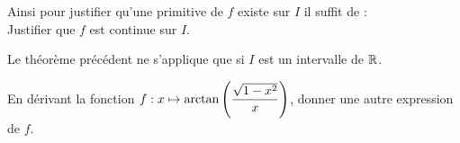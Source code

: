 \documentclass[a4paper, 11pt]{article}
\begin{document}
\begin{center}
	\begin{dboxminipage}{11cm}
		Ainsi pour justifier qu'une primitive de $f$ existe sur $I$ il suffit de :\\
		Justifier que $f$ est continue sur $I$.
	\end{dboxminipage}
\end{center}










\warning  Le th\'eor\`{e}me pr\'ec\'edent ne s'applique que si $I$ est un intervalle de $\mathbb{R}$.

	{\footnotesize \begin{exo}
			En d\'erivant la fonction $f: x\mapsto \arctan{\left( \displaystyle\frac{\sqrt{1-x^2}}{x} \right)}$, donner une autre expression de $f$.
		\end{exo}
	}


\href{http://olivierglorieux.fr/wp-content/uploads/Cours/formulaire_primitives.pdf}{\color{blue}{Voir le  tableau des primitives usuelles}}

%
%
\end{document}
